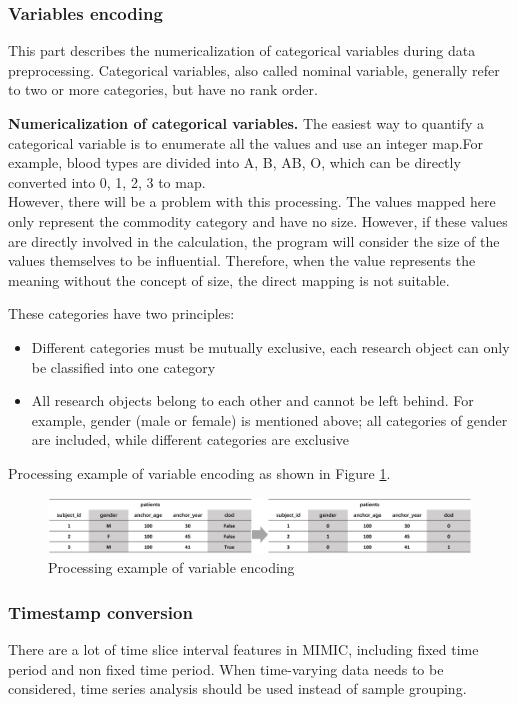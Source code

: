 \subsubsection{Variables encoding}
This part describes the numericalization of categorical variables during data preprocessing. Categorical variables, also called nominal variable, generally refer to two or more categories, but have no rank order.

\textbf{Numericalization of categorical variables.} The easiest way to quantify a categorical variable is to enumerate all the values and use an integer map.For example, blood types are divided into A, B, AB, O, which can be directly converted into 0, 1, 2, 3 to map.\\However, there will be a problem with this processing. The values mapped here only represent the commodity category and have no size. However, if these values are directly involved in the calculation, the program will consider the size of the values themselves to be influential. Therefore, when the value represents the meaning without the concept of size, the direct mapping is not suitable.

These categories have two principles: 
\begin{itemize}
\item Different categories must be mutually exclusive, each research object can only be classified into one category
\item All research objects belong to each other and cannot be left behind. For example, gender (male or female) is mentioned above; all categories of gender are included, while different categories are exclusive
\end{itemize}

Processing example of variable encoding as shown in Figure \ref{fig:MIMIC_variable_encoding}.

\begin{figure}[ht]
    \centering
    \includegraphics[width=1\linewidth]{images/MIMIC_variable_encoding.png}
    \caption{Processing example of variable encoding}
    \label{fig:MIMIC_variable_encoding}
\end{figure}

\subsubsection{Timestamp conversion}
There are a lot of time slice interval features in MIMIC, including fixed time period and non fixed time period. When time-varying data needs to be considered, time series analysis should be used instead of sample grouping.

